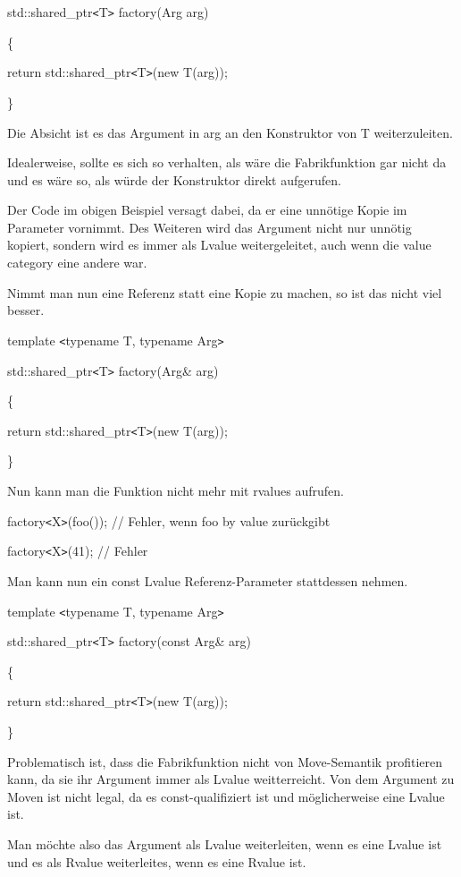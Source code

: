 \documentclass{article}
\begin{document}
std::shared\_ptr\texttt{<}T\texttt{>} factory(Arg arg)

\{    

\parindent=14pt
return std::shared\_ptr\texttt{<}T\texttt{>}(new T(arg));

\parindent=0pt
\}

Die Absicht ist es das Argument in arg an den Konstruktor von T weiterzuleiten.

Idealerweise, sollte es sich so verhalten, als wäre die Fabrikfunktion gar nicht 
da und es wäre so, als würde der Konstruktor direkt aufgerufen.

Der Code im obigen Beispiel versagt dabei, da er eine unnötige Kopie im Parameter 
vornimmt. Des Weiteren wird das Argument nicht nur unnötig kopiert, sondern wird 
es immer als Lvalue weitergeleitet, auch wenn die value category eine andere war.

Nimmt man nun eine Referenz statt eine Kopie zu machen, so ist das nicht viel besser.

template \texttt{<}typename T, typename Arg\texttt{>}

std::shared\_ptr\texttt{<}T\texttt{>} factory(Arg\& arg)

\{    

\parindent=14pt
return std::shared\_ptr\texttt{<}T\texttt{>}(new T(arg));

\parindent=0pt
\}

Nun kann man die Funktion nicht mehr mit rvalues aufrufen.

factory\texttt{<}X\texttt{>}(foo()); // Fehler, wenn foo by value zurückgibt

factory\texttt{<}X\texttt{>}(41);    // Fehler

Man kann nun ein const Lvalue Referenz-Parameter stattdessen nehmen.

template \texttt{<}typename T, typename Arg\texttt{>}

std::shared\_ptr\texttt{<}T\texttt{>} factory(const Arg\& arg) 

\{    

\parindent=14pt
return std::shared\_ptr\texttt{<}T\texttt{>}(new T(arg));

\parindent=0pt
\}

Problematisch ist, dass die Fabrikfunktion nicht von Move-Semantik profitieren 
kann, da sie ihr Argument immer als Lvalue weitterreicht. Von dem Argument zu Moven 
ist nicht legal, da es const-qualifiziert ist und möglicherweise eine Lvalue ist.

Man möchte also das Argument als Lvalue weiterleiten, wenn es eine Lvalue ist 
und es als Rvalue weiterleites, wenn es eine Rvalue ist.
\end{document}
